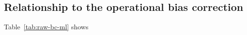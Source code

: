 \subsection{Relationship to the operational bias correction}
\label{sec:disc-opt_bc}






Table~\ref{tab:raw-bc-ml} shows